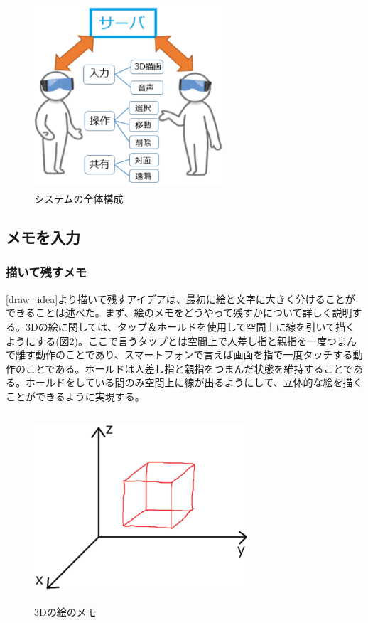 \documentclass[11pt,a4j, titlepage]{jarticle} %
\begin{document}
\begin{figure}[H]
  \begin{center}
    \includegraphics[clip,height=7.0cm,width=7.0cm]{./system_zentai.eps}
    \caption{システムの全体構成}
    \label{fig:system_zentai}
  \end{center}
\end{figure}

\subsection{メモを入力}

\subsubsection{描いて残すメモ} \label{draw_memo}
\ref{draw_idea}より描いて残すアイデアは、最初に絵と文字に大きく分けることができることは述べた。まず、絵のメモをどうやって残すかについて詳しく説明する。3Dの絵に関しては、タップ＆ホールドを使用して空間上に線を引いて描くようにする(図\ref{fig:3d_draw})。ここで言うタップとは空間上で人差し指と親指を一度つまんで離す動作のことであり、スマートフォンで言えば画面を指で一度タッチする動作のことである。ホールドは人差し指と親指をつまんだ状態を維持することである。ホールドをしている間のみ空間上に線が出るようにして、立体的な絵を描くことができるように実現する。

\begin{figure}[H]
  \begin{center}
    \includegraphics[clip,height=7.0cm,width=8.0cm]{./3d_draw.eps}
    \caption{3Dの絵のメモ}
    \label{fig:3d_draw}
  \end{center}
\end{figure}
\end{document}
